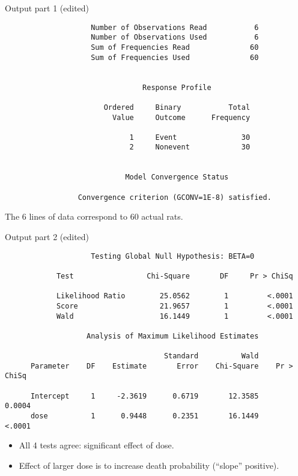 \documentclass[pdf]{prosper}
\begin{document}
\begin{slide}{Output part 1 (edited)}

{\scriptsize
\begin{verbatim}
                    Number of Observations Read           6
                    Number of Observations Used           6
                    Sum of Frequencies Read              60
                    Sum of Frequencies Used              60


                                Response Profile

                       Ordered     Binary           Total
                         Value     Outcome      Frequency

                             1     Event               30
                             2     Nonevent            30


                            Model Convergence Status

                 Convergence criterion (GCONV=1E-8) satisfied.

\end{verbatim}
}

The 6 lines of data correspond to 60 actual rats.
  
\end{slide}

\begin{slide}{Output part 2 (edited)}

{\scriptsize
\begin{verbatim}
                    Testing Global Null Hypothesis: BETA=0

            Test                 Chi-Square       DF     Pr > ChiSq

            Likelihood Ratio        25.0562        1         <.0001
            Score                   21.9657        1         <.0001
            Wald                    16.1449        1         <.0001

                   Analysis of Maximum Likelihood Estimates

                                     Standard          Wald
      Parameter    DF    Estimate       Error    Chi-Square    Pr > ChiSq

      Intercept     1     -2.3619      0.6719       12.3585        0.0004
      dose          1      0.9448      0.2351       16.1449        <.0001

\end{verbatim}
}

\begin{itemize}
\item 
All 4 tests agree: significant effect of dose. 
\item Effect of larger dose is to increase death probability (``slope'' positive).
\end{itemize}
  
\end{slide}
\end{document}
